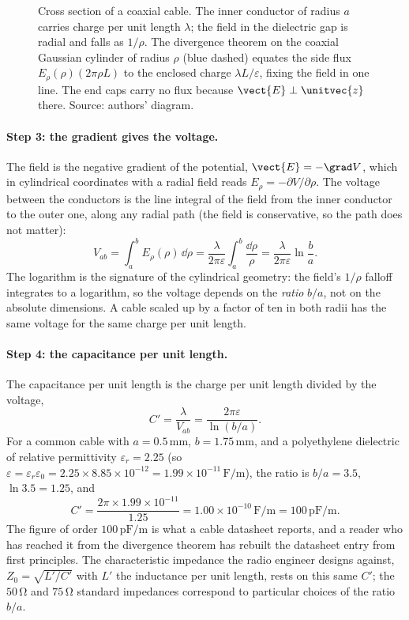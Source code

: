 \begin{figure}[h]
  \centering
  
  \caption[Coaxial cable: radial field and Gaussian surface.]{Cross
  section of a coaxial cable. The inner conductor of radius $a$ carries
  charge per unit length $\lambda$; the field in the dielectric gap is
  radial and falls as $1/\rho$. The divergence theorem on the coaxial
  Gaussian cylinder of radius $\rho$ (blue dashed) equates the side
  flux $E_{\rho}(\rho)(2\pi\rho L)$ to the enclosed charge $\lambda L
  /\varepsilon$, fixing the field in one line. The end caps carry no
  flux because $\vect{E}\perp\unitvec{z}$ there. Source: authors'
  diagram.}
  \label{fig:vol02:ch08:coaxial-field}
\end{figure}

\paragraph{Step 3: the gradient gives the voltage.} The field is the
negative gradient of the potential, $\vect{E} = -\grad V$, which in
cylindrical coordinates with a radial field reads
$E_{\rho} = -\partial V/\partial\rho$. The voltage between the
conductors is the line integral of the field from the inner conductor
to the outer one, along any radial path (the field is conservative, so
the path does not matter):
\[
V_{ab} = \int_{a}^{b}E_{\rho}(\rho)\,\dd\rho = \frac{\lambda}
{2\pi\varepsilon}\int_{a}^{b}\frac{\dd\rho}{\rho} = \frac{\lambda}
{2\pi\varepsilon}\ln\!\frac{b}{a}.
\]
The logarithm is the signature of the cylindrical geometry: the field's
$1/\rho$ falloff integrates to a logarithm, so the voltage depends on
the \emph{ratio} $b/a$, not on the absolute dimensions. A cable scaled
up by a factor of ten in both radii has the same voltage for the same
charge per unit length.

\paragraph{Step 4: the capacitance per unit length.} The capacitance
per unit length is the charge per unit length divided by the voltage,
\[
C' = \frac{\lambda}{V_{ab}} = \frac{2\pi\varepsilon}{\ln(b/a)}.
\]
For a common cable with $a = 0.5\,\si{\milli\meter}$, $b = 1.75\,
\si{\milli\meter}$, and a polyethylene dielectric of relative
permittivity $\varepsilon_{r} = 2.25$ (so $\varepsilon =
\varepsilon_{r}\varepsilon_{0} = 2.25\times 8.85\times 10^{-12} =
1.99\times 10^{-11}\,\si{\farad\per\meter}$), the ratio is
$b/a = 3.5$, $\ln 3.5 = 1.25$, and
\[
C' = \frac{2\pi\times 1.99\times 10^{-11}}{1.25} = 1.00\times 10^{-10}
\,\si{\farad\per\meter} = 100\,\si{\pico\farad\per\meter}.
\]
The figure of order $100\,\si{\pico\farad\per\meter}$ is what a cable
datasheet reports, and a reader who has reached it from the divergence
theorem has rebuilt the datasheet entry from first principles. The
characteristic impedance the radio engineer designs against,
$Z_{0} = \sqrt{L'/C'}$ with $L'$ the inductance per unit length, rests
on this same $C'$; the $50\,\si{\ohm}$ and $75\,\si{\ohm}$ standard
impedances correspond to particular choices of the ratio $b/a$.

